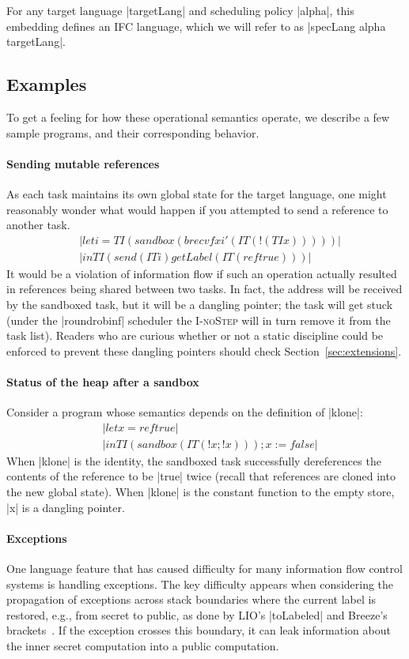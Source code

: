 For any target language |targetLang| and scheduling policy |alpha|, this
embedding defines an IFC language, which we will
refer to as |specLang alpha targetLang|.

\subsection{Examples}

To get a feeling for how these operational semantics operate, we
describe a few sample programs, and their corresponding behavior.

\paragraph{Sending mutable references}  As each task maintains its own
global state for the target language, one might reasonably wonder what would
happen if you attempted to send a reference to another task.
\begin{align*}
    & |let i = TI (sandbox (brecvf x i' (IT (!(TI x)))))|\\
    & |in TI (send (IT i) getLabel (IT (ref true)))|
\end{align*}
It would be a violation of information flow if such an operation actually
resulted in references being shared between two tasks.  In fact, the address
will be received by the sandboxed task, but it will be a dangling pointer; the
task will get stuck (under the |roundrobinf| scheduler the \textsc{I-noStep} will in turn remove it from the task list).  Readers
who are curious whether or not a static discipline could be enforced to
prevent these dangling pointers should check Section~\ref{sec:extensions}.

\paragraph{Status of the heap after a sandbox}  Consider a program whose
semantics depends on the definition of |klone|:
\begin{align*}
    & |let x = ref true| \\
    & |in TI (sandbox (IT (!x; !x))); x := false|
\end{align*}
When |klone| is the identity, the sandboxed task successfully dereferences
the contents of the reference to be |true| twice (recall that references
are cloned into the new global state).  When |klone| is the constant function
to the empty store, |x| is a dangling pointer.

\paragraph{Exceptions}  One language feature that has caused difficulty for
many information flow control systems is handling exceptions.
%
The key difficulty appears when considering the propagation of exceptions
across stack boundaries where the current label is restored, e.g., from secret
to public, as done by LIO's |toLabeled| and Breeze's
brackets~\cite{Hritcu:2013:YIB:2497621.2498098, stefan:2012:arxiv-flexible}.
%
If the exception crosses this boundary, it can leak information about the
inner secret computation into a public computation.


